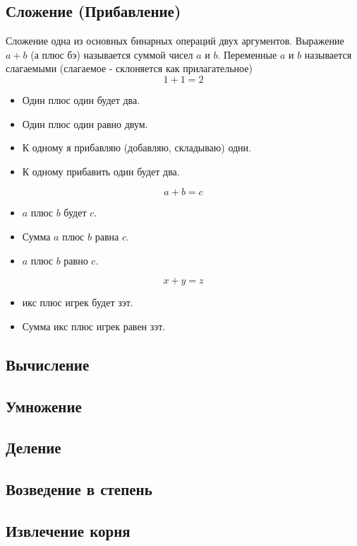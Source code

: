 \documentclass[fleqn,11pt]{article}
\newcommand{\rtxt}[1]{\textsf{#1}}
\theoremstyle{definition}
\newenvironment{tightitem}{
\begin{itemize}
  \setlength{\itemsep}{1pt}
  \setlength{\parskip}{0pt}
  \setlength{\parsep}{0pt}}{\end{itemize}
}
\begin{document}
\subsection{Сложение (Прибавление)}
Сложение одна из основных бинарных операций двух аргументов. Выражение $a + b$ (\rtxt{а плюс бэ}) называется суммой
чисел $a$ и $b$. Переменные $a$ и $b$ называется слагаемыми (слагаемое - склоняется как прилагательное)
\[1 + 1 = 2\]
\begin{tightitem}
    \item \rtxt{Один плюс один будет два.}
    \item \rtxt{Один плюс один равно двум.}
    \item \rtxt{К одному я прибавляю (добавляю, складываю) одни.}
    \item \rtxt{К одному прибавить один будет два.}
\end{tightitem}
\[a + b = c\]
\begin{tightitem}
    \item \rtxt{$a$ плюс $b$ будет $c$.}
    \item \rtxt{Сумма $a$ плюс $b$ равна $c$.}
    \item \rtxt{$a$ плюс $b$ равно $c$.}
\end{tightitem}
\[x + y = z\]
\begin{tightitem}
    \item \rtxt{икс плюс игрек будет зэт.}
    \item \rtxt{Сумма икс плюс игрек равен зэт.}
\end{tightitem}

\subsection{Вычисление}

\subsection{Умножение}

\subsection{Деление}

\subsection{Возведение в степень}

\subsection{Извлечение корня}
\end{document}
